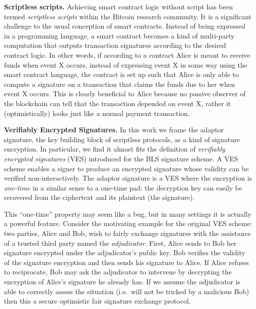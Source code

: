 \documentclass[fullpage]{article}
\theoremstyle{definition}
\begin{document}
\textbf{Scriptless scripts.} Achieving smart contract logic without script has been termed \emph{scriptless scripts} within the Bitcoin research community. It is a significant challenge to the usual conception of smart contracts. Instead of being expressed in a programming language, a smart contract becomes a kind of multi-party computation that outputs transaction signatures according to the desired contract logic. In other words, if according to a contract Alice is meant to receive funds when event X occurs, instead of expressing event X in some way using the smart contract language, the contract is set up such that Alice is only able to compute a signature on a transaction that claims the funds due to her when event X occurs. This is clearly beneficial to Alice because no passive observer of the blockchain can tell that the transaction depended on event X, rather it (optimistically) looks just like a normal payment transaction.

\textbf{Verifiably Encrypted Signatures.} In this work we frame the adaptor signature, the key building block of scriptless protocols, as a kind of signature encryption. In particular, we find it almost fits the definition of \emph{verifiably encrypted signatures}\cite{Boneh:2003:AVE:1766171.1766207} (VES) introduced for the BLS signature scheme\cite{Boneh:2001:SSW:647097.717005}. A VES scheme enables a signer to produce an encrypted signature whose validity can be verified non-interactively. The adaptor signature is a VES where the encryption is \emph{one-time} in a similar sense to a one-time pad: the decryption key can easily be recovered from the ciphertext and its plaintext (the signature).

This ``one-time'' property may seem like a bug, but in many settings it is actually a powerful feature. Consider the motivating example for the original VES scheme\cite{Boneh:2003:AVE:1766171.1766207}: two parties, Alice and Bob, wish to fairly exchange signatures with the assistance of a trusted third party named the \emph{adjudicator}. First, Alice sends to Bob her signature encrypted under the adjudicator's public key. Bob verifies the validity of the signature encryption and then sends his signature to Alice. If Alice refuses to reciprocate, Bob may ask the adjudicator to intervene by decrypting the encryption of Alice's signature he already has. If we assume the adjudicator is able to correctly assess the situation (i.e.\ will not be tricked by a malicious Bob) then this a secure optimistic fair signature exchange protocol.
\end{document}
